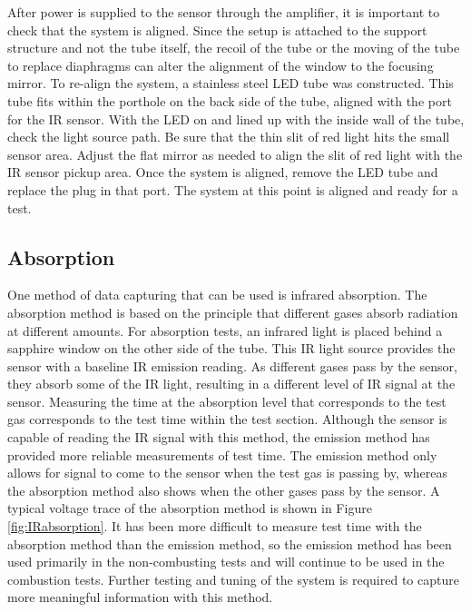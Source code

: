 After power is supplied to the sensor through the amplifier, it is important to check that the system is aligned. Since the setup is attached to the support structure and not the tube itself, the recoil of the tube or the moving of the tube to replace diaphragms can alter the alignment of the window to the focusing mirror. To re-align the system, a stainless steel LED tube was constructed. This tube fits within the porthole on the back side of the tube, aligned with the port for the IR sensor. With the LED on and lined up with the inside wall of the tube, check the light source path. Be sure that the thin slit of red light hits the small sensor area. Adjust the flat mirror as needed to align the slit of red light with the IR sensor pickup area. Once the system is aligned, remove the LED tube and replace the plug in that port. The system at this point is aligned and ready for a test.  


\subsection{Absorption}

One method of data capturing that can be used is infrared absorption. The absorption method is based on the principle that different gases absorb radiation at different amounts. For absorption tests, an infrared light is placed behind a sapphire window on the other side of the tube. This IR light source provides the sensor with a baseline IR emission reading. As different gases pass by the sensor, they absorb some of the IR light, resulting in a different level of IR signal at the sensor. Measuring the time at the absorption level that corresponds to the test gas corresponds to the test time within the test section. Although the sensor is capable of reading the IR signal with this method, the emission method has provided more reliable measurements of test time. The emission method only allows for signal to come to the sensor when the test gas is passing by, whereas the absorption method also shows when the other gases pass by the sensor. A typical voltage trace of the absorption method is shown in Figure \ref{fig:IRabsorption}. It has been more difficult to measure test time with the absorption method than the emission method, so the emission method has been used primarily in the non-combusting tests and will continue to be used in the combustion tests. Further testing and tuning of the system is required to capture more meaningful information with this method. 


